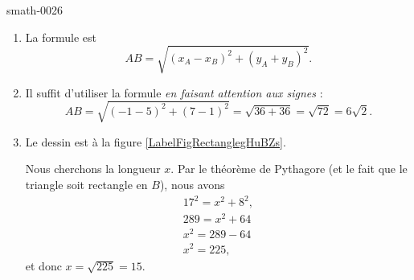 
\begin{corrige}{smath-0026}

    \begin{enumerate}
        \item
            La formule est
            \begin{equation}
                AB=\sqrt{  (x_A-x_B)^2+(y_A+y_B)^2 }.
            \end{equation}
        \item
            Il suffit d'utiliser la formule \emph{en faisant attention aux signes} :
            \begin{equation}
                AB=\sqrt{  (-1-5)^2+(7-1)^2 }=\sqrt{36+36}=\sqrt{72}=6\sqrt{2}.
            \end{equation}
        \item
            Le dessin est à la figure \ref{LabelFigRectanglegHuBZs}. %
            \newcommand{\CaptionFigRectanglegHuBZs}{Le triangle de l'exercice \ref{exosmath-0026}.}
            
            Nous cherchons la longueur \( x\). Par le théorème de Pythagore (et le fait que le triangle soit rectangle en \( B\)), nous avons
            \begin{subequations}
                \begin{align}
                17^2=x^2+8^2,\\
                289=x^2+64\\
                x^2=289-64    \\
                x^2=225,
                \end{align}
            \end{subequations}
            et donc \( x=\sqrt{225}=15\).
    \end{enumerate}

\end{corrige}
